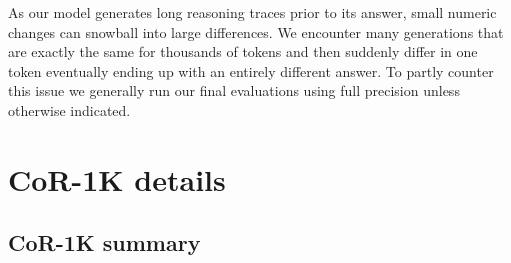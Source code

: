 \documentclass{article}
\theoremstyle{plain}
\theoremstyle{definition}
\theoremstyle{remark}
\newcommand{\data}{\textbf{CoR-1K}}
\begin{document}
As our model generates long reasoning traces prior to its answer, small numeric changes can snowball into large differences. We encounter many generations that are exactly the same for thousands of tokens and then suddenly differ in one token eventually ending up with an entirely different answer. To partly counter this issue we generally run our final evaluations using full precision unless otherwise indicated.

\FloatBarrier

\section{\data{} details}
\label{sec:details}

\subsection{\data{} summary}
\end{document}
